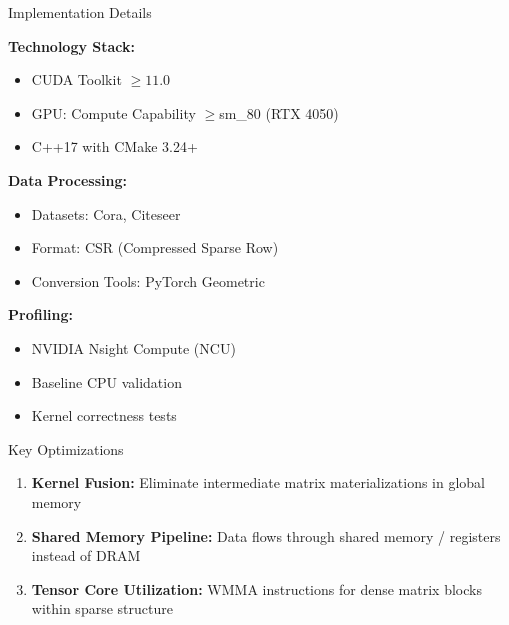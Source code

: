 \documentclass[final]{beamer}
\newlength{\colwidth}
\begin{document}
\begin{frame}[t]
\begin{columns}[t]

\begin{column}{\colwidth}

  \begin{block}{Implementation Details}

    \textbf{Technology Stack:}
    \begin{itemize}
      \item CUDA Toolkit $\geq\!11.0$
      \item GPU: Compute Capability $\geq\!$sm\_80 (RTX 4050)
      \item C++17 with CMake 3.24+
    \end{itemize}

    \vspace{0.5em}
    
    \textbf{Data Processing:}
    \begin{itemize}
      \item Datasets: Cora, Citeseer
      \item Format: CSR (Compressed Sparse Row)
      \item Conversion Tools: PyTorch Geometric
    \end{itemize}

    \vspace{0.5em}
    
    \textbf{Profiling:}
    \begin{itemize}
      \item NVIDIA Nsight Compute (NCU)
      \item Baseline CPU validation
      \item Kernel correctness tests
    \end{itemize}

  \end{block}

  \begin{block}{Key Optimizations}

    \begin{enumerate}
      \item \textbf{Kernel Fusion:} Eliminate intermediate matrix materializations in global memory
      
      \item \textbf{Shared Memory Pipeline:} Data flows through shared memory / registers instead of DRAM
      
      \item \textbf{Tensor Core Utilization:} WMMA instructions for dense matrix blocks within sparse structure
      

\end{enumerate}
\end{block}
\end{column}
\end{columns}
\end{frame}
\end{document}
